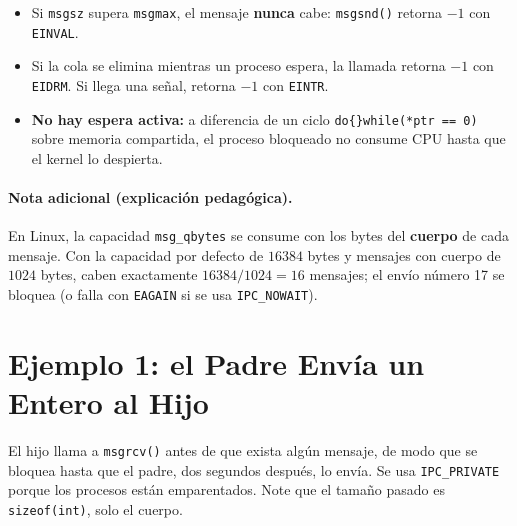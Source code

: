 \documentclass[12pt,a4paper]{article}
\begin{document}
\begin{itemize}
    \item Si \texttt{msgsz} supera \texttt{msgmax}, el mensaje \textbf{nunca} cabe: \texttt{msgsnd()} retorna $-1$ con \texttt{EINVAL}.
    \item Si la cola se elimina mientras un proceso espera, la llamada retorna $-1$ con \texttt{EIDRM}. Si llega una señal, retorna $-1$ con \texttt{EINTR}.
    \item \textbf{No hay espera activa:} a diferencia de un ciclo \texttt{do\{\}while(*ptr == 0)} sobre memoria compartida, el proceso bloqueado no consume CPU hasta que el kernel lo despierta.
\end{itemize}

\paragraph{Nota adicional (explicación pedagógica).} En Linux, la capacidad \texttt{msg\_qbytes} se consume con los bytes del \textbf{cuerpo} de cada mensaje. Con la capacidad por defecto de $16384$ bytes y mensajes con cuerpo de $1024$ bytes, caben exactamente $16384 / 1024 = 16$ mensajes; el envío número 17 se bloquea (o falla con \texttt{EAGAIN} si se usa \texttt{IPC\_NOWAIT}).

\newpage

\section{Ejemplo 1: el Padre Envía un Entero al Hijo}
El hijo llama a \texttt{msgrcv()} antes de que exista algún mensaje, de modo que se bloquea hasta que el padre, dos segundos después, lo envía. Se usa \texttt{IPC\_PRIVATE} porque los procesos están emparentados. Note que el tamaño pasado es \texttt{sizeof(int)}, solo el cuerpo.
\end{document}
